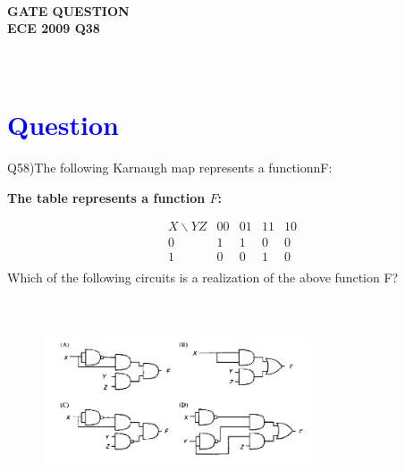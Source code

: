 \documentclass[a4paper,12pt]{article}
\begin{document}
\pagestyle{empty} %

\thispagestyle{fancy} %
\fancyhf{} %
\renewcommand{\headrulewidth}{0pt} %


\vspace{1cm}
\begin{center}

    {\LARGE \textbf{\textcolor{darkskyblue}{\\  GATE QUESTION \\ ECE 2009 Q38}}}
\end{center}

\vspace{-1cm} %
\section*{\textcolor{blue}{\\Question}}
Q58)The following Karnaugh map represents a functionnF:
\vspace{1cm}
\noindent
\begin{center}
\textbf{The table represents a function \( F \):}
\end{center}

\vspace{1em}
\[
\begin{array}{c|cccc}
X \backslash YZ & 00 & 01 & 11 & 10 \\
\hline
0 & 1 & 1 & 0 & 0 \\
1 & 0 & 0 & 1 & 0 \\
\end{array}
\]
\vspace{0.5em}
Which of the following circuits is a realization of the above function F?

\vspace{1em}
\begin{figure}[!h]
 \centering
     \includegraphics[width=8cm,height=6cm]{img2.png}
     \caption{}

 \end{figure}
\end{document}

